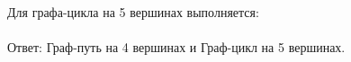 \documentclass{article}
\begin{document}
\\\\Для графа-цикла на 5 вершинах выполняется:\\
\\
Ответ: Граф-путь на 4 вершинах и Граф-цикл на 5 вершинах.
\end{document}
